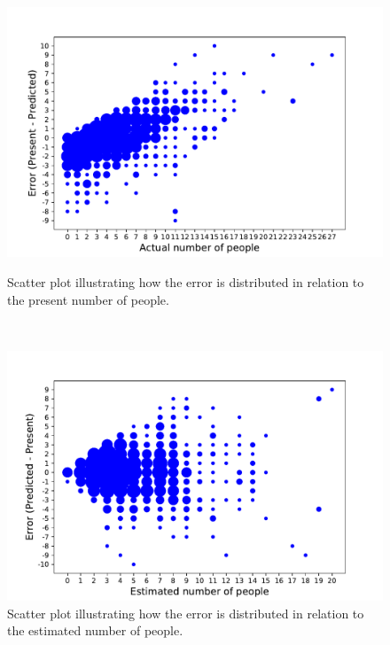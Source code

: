 \begin{figure}[h!]
\begin{minipage}[b]{8.5cm}
\centering
\includegraphics[width=1\textwidth]{images/scatterplotpres}
\caption{Scatter plot illustrating how the error is distributed in relation to the present number of people.}
\label{fig:scatterplotpres}
\end{minipage}
\ \hspace{2mm} \hspace{3mm} \
\begin{minipage}[b]{8.5cm}
\centering
\includegraphics[width=1\textwidth]{images/scatterplotest}
\caption{Scatter plot illustrating how the error is distributed in relation to the estimated number of people.}
\label{fig:scatterplotest}
\end{minipage}
\end{figure}


